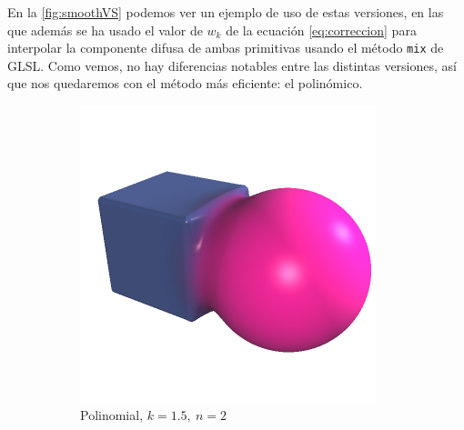 En la \autoref{fig:smoothVS} podemos ver un ejemplo de uso de estas versiones, en las que además se ha usado el valor de $w_k$ de la ecuación \autoref{eq:correccion} para interpolar la componente difusa de ambas primitivas usando el método \texttt{mix} de GLSL. Como vemos, no hay diferencias notables entre las distintas versiones, así que nos quedaremos con el método más eficiente: el polinómico.
\begin{figure}[htbp]
    \centering
    \begin{subfigure}[b]{0.25\textwidth}
        \centering
        \includegraphics[width=\textwidth]{Plantilla-TFG-master/img/unionMethodOG.png}
        \caption{Polinomial, $k=1.5,\ n=2$}
    \end{subfigure}
    \hfill
    \begin{subfigure}[b]{0.25\textwidth}
        \centering

\end{subfigure}
\end{figure}
